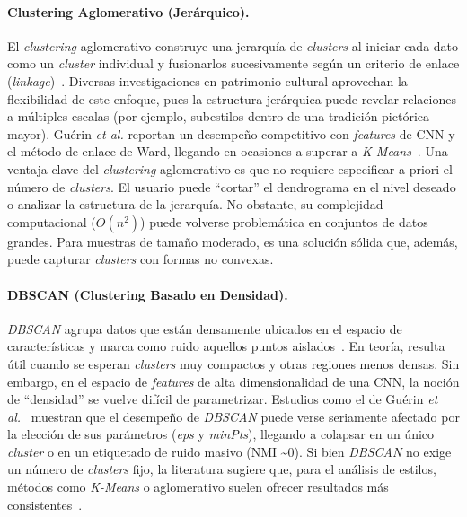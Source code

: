 \paragraph{Clustering Aglomerativo (Jerárquico).}
El \textit{clustering} aglomerativo construye una jerarquía de \textit{clusters} al iniciar cada dato como un \textit{cluster} individual y fusionarlos sucesivamente según un criterio de enlace (\textit{linkage})~\cite{guerin2018,parisotto2022}.
Diversas investigaciones en patrimonio cultural aprovechan la flexibilidad de este enfoque, pues la estructura jerárquica puede revelar relaciones a múltiples escalas (por ejemplo, subestilos dentro de una tradición pictórica mayor).
Guérin \textit{et al.} reportan un desempeño competitivo con \textit{features} de CNN y el método de enlace de Ward, llegando en ocasiones a superar a \textit{K-Means}~\cite{guerin2018}.
Una ventaja clave del \textit{clustering} aglomerativo es que no requiere especificar a priori el número de \textit{clusters}.
El usuario puede “cortar” el dendrograma en el nivel deseado o analizar la estructura de la jerarquía. No obstante, su complejidad computacional ($O(n^2)$) puede volverse problemática en conjuntos de datos grandes.
Para muestras de tamaño moderado, es una solución sólida que, además, puede capturar \textit{clusters} con formas no convexas.

\paragraph{DBSCAN (Clustering Basado en Densidad).}
\textit{DBSCAN} agrupa datos que están densamente ubicados en el espacio de características y marca como ruido aquellos puntos aislados~\cite{guerin2018}.
En teoría, resulta útil cuando se esperan \textit{clusters} muy compactos y otras regiones menos densas.
Sin embargo, en el espacio de \textit{features} de alta dimensionalidad de una CNN, la noción de “densidad” se vuelve difícil de parametrizar.
Estudios como el de Guérin \textit{et al.}~\cite{guerin2018} muestran que el desempeño de \textit{DBSCAN} puede verse seriamente afectado por la elección de sus parámetros (\textit{eps} y \textit{minPts}), llegando a colapsar en un único \textit{cluster} o en un etiquetado de ruido masivo (NMI \textasciitilde 0).
Si bien \textit{DBSCAN} no exige un número de \textit{clusters} fijo, la literatura sugiere que, para el análisis de estilos, métodos como \textit{K-Means} o aglomerativo suelen ofrecer resultados más consistentes~\cite{dangeti2024}.

